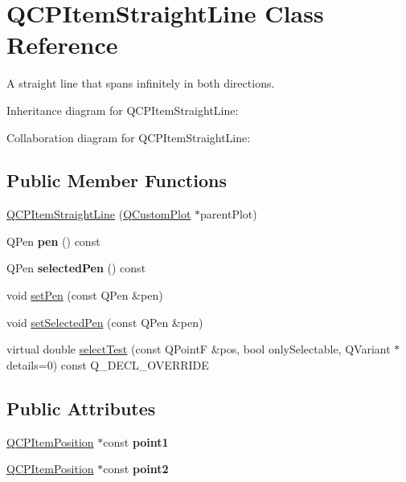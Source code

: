 \hypertarget{classQCPItemStraightLine}{}\section{Q\+C\+P\+Item\+Straight\+Line Class Reference}
\label{classQCPItemStraightLine}


A straight line that spans infinitely in both directions.  




Inheritance diagram for Q\+C\+P\+Item\+Straight\+Line\+:


Collaboration diagram for Q\+C\+P\+Item\+Straight\+Line\+:
\subsection*{Public Member Functions}
\begin{DoxyCompactItemize}
\item 
\hyperlink{classQCPItemStraightLine_a41fd2e1f006983449eca9830930c3b10}{Q\+C\+P\+Item\+Straight\+Line} (\hyperlink{classQCustomPlot}{Q\+Custom\+Plot} $\ast$parent\+Plot)
\item 
Q\+Pen {\bfseries pen} () const \hypertarget{classQCPItemStraightLine_ad858ab1a444391aab778f765453ea222}{}\label{classQCPItemStraightLine_ad858ab1a444391aab778f765453ea222}

\item 
Q\+Pen {\bfseries selected\+Pen} () const \hypertarget{classQCPItemStraightLine_a9e33ae966a7e2ea1083b3b9aeabeaea5}{}\label{classQCPItemStraightLine_a9e33ae966a7e2ea1083b3b9aeabeaea5}

\item 
void \hyperlink{classQCPItemStraightLine_a9f36c9c9e60d7d9ac084c80380ac8601}{set\+Pen} (const Q\+Pen \&pen)
\item 
void \hyperlink{classQCPItemStraightLine_a5c33559498d33543fa95cf0a36e851ff}{set\+Selected\+Pen} (const Q\+Pen \&pen)
\item 
virtual double \hyperlink{classQCPItemStraightLine_a2e36c9d4dcc3aeda78a5584f790e39e3}{select\+Test} (const Q\+PointF \&pos, bool only\+Selectable, Q\+Variant $\ast$details=0) const Q\+\_\+\+D\+E\+C\+L\+\_\+\+O\+V\+E\+R\+R\+I\+DE
\end{DoxyCompactItemize}
\subsection*{Public Attributes}
\begin{DoxyCompactItemize}
\item 
\hyperlink{classQCPItemPosition}{Q\+C\+P\+Item\+Position} $\ast$const {\bfseries point1}\hypertarget{classQCPItemStraightLine_ac131a6ffe456f2cc7364dce541fe0120}{}\label{classQCPItemStraightLine_ac131a6ffe456f2cc7364dce541fe0120}

\item 
\hyperlink{classQCPItemPosition}{Q\+C\+P\+Item\+Position} $\ast$const {\bfseries point2}\hypertarget{classQCPItemStraightLine_ad26c0a732e471f63f75d481dcd48cfc9}{}\label{classQCPItemStraightLine_ad26c0a732e471f63f75d481dcd48cfc9}

\end{DoxyCompactItemize}

